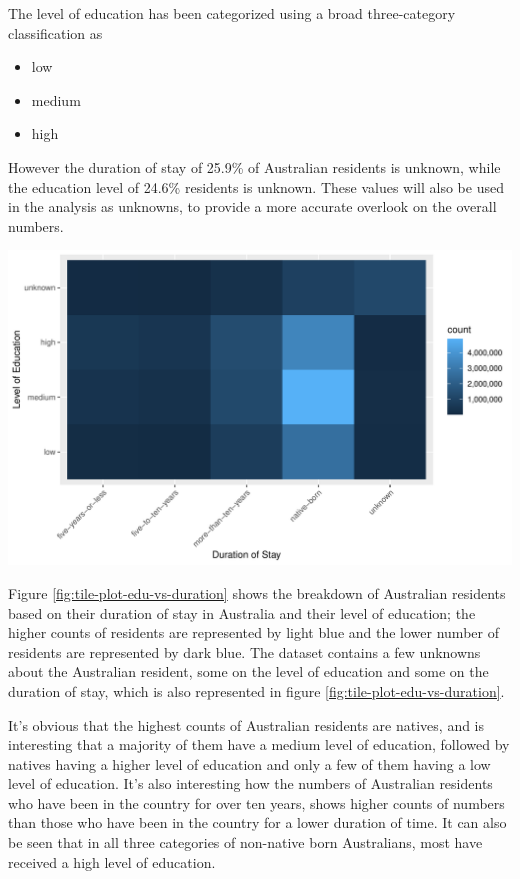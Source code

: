 \documentclass[11pt,a4paper,]{article}
\providecommand{\tightlist}{%
  \setlength{\itemsep}{0pt}\setlength{\parskip}{0pt}}
\let\origfigure\figure
\let\endorigfigure\endfigure
\renewenvironment{figure}[1][2] {
    \expandafter\origfigure\expandafter[H]
} {
    \endorigfigure
}%
\begin{document}
The level of education has been categorized using a broad three-category classification as

\begin{itemize}
\tightlist
\item
  low
\item
  medium
\item
  high
\end{itemize}

However the duration of stay of 25.9\% of Australian residents is unknown, while the education level of 24.6\% residents is unknown. These values will also be used in the analysis as unknowns, to provide a more accurate overlook on the overall numbers.

\begin{figure}
\centering
\includegraphics{ETC5513assignment4_files/figure-latex/tile-plot-edu-vs-duration-1.pdf}
\caption{\label{fig:tile-plot-edu-vs-duration}Breakdown of Australian residents based on their level of Education and duration of stay in Australia}
\end{figure}

Figure \ref{fig:tile-plot-edu-vs-duration} shows the breakdown of Australian residents based on their duration of stay in Australia and their level of education; the higher counts of residents are represented by light blue and the lower number of residents are represented by dark blue. The dataset contains a few unknowns about the Australian resident, some on the level of education and some on the duration of stay, which is also represented in figure \ref{fig:tile-plot-edu-vs-duration}.

It's obvious that the highest counts of Australian residents are natives, and is interesting that a majority of them have a medium level of education, followed by natives having a higher level of education and only a few of them having a low level of education.
It's also interesting how the numbers of Australian residents who have been in the country for over ten years, shows higher counts of numbers than those who have been in the country for a lower duration of time. It can also be seen that in all three categories of non-native born Australians, most have received a high level of education.
\end{document}
